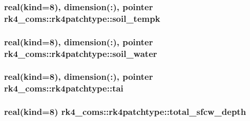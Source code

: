 \subsubsection[{soil\+\_\+tempk}]{\setlength{\rightskip}{0pt plus 5cm}real(kind=8), dimension(\+:), pointer rk4\+\_\+coms\+::rk4patchtype\+::soil\+\_\+tempk}\label{structrk4__coms_1_1rk4patchtype_af643afd1384100e350b98cb17d1dc238}
\hypertarget{structrk4__coms_1_1rk4patchtype_aeb9d5fbd131ed7efcf9b750704de0bdb}{}
\subsubsection[{soil\+\_\+water}]{\setlength{\rightskip}{0pt plus 5cm}real(kind=8), dimension(\+:), pointer rk4\+\_\+coms\+::rk4patchtype\+::soil\+\_\+water}\label{structrk4__coms_1_1rk4patchtype_aeb9d5fbd131ed7efcf9b750704de0bdb}
\hypertarget{structrk4__coms_1_1rk4patchtype_a523808c2c1d428e2467f48654a44217a}{}
\subsubsection[{tai}]{\setlength{\rightskip}{0pt plus 5cm}real(kind=8), dimension(\+:), pointer rk4\+\_\+coms\+::rk4patchtype\+::tai}\label{structrk4__coms_1_1rk4patchtype_a523808c2c1d428e2467f48654a44217a}
\hypertarget{structrk4__coms_1_1rk4patchtype_a83c6c4f108f8f222d17ef271d8bdbdd8}{}
\subsubsection[{total\+\_\+sfcw\+\_\+depth}]{\setlength{\rightskip}{0pt plus 5cm}real(kind=8) rk4\+\_\+coms\+::rk4patchtype\+::total\+\_\+sfcw\+\_\+depth}\label{structrk4__coms_1_1rk4patchtype_a83c6c4f108f8f222d17ef271d8bdbdd8}
\hypertarget{structrk4__coms_1_1rk4patchtype_ac1d59ef3d393cc281ca923b9bcaa5743}{}
